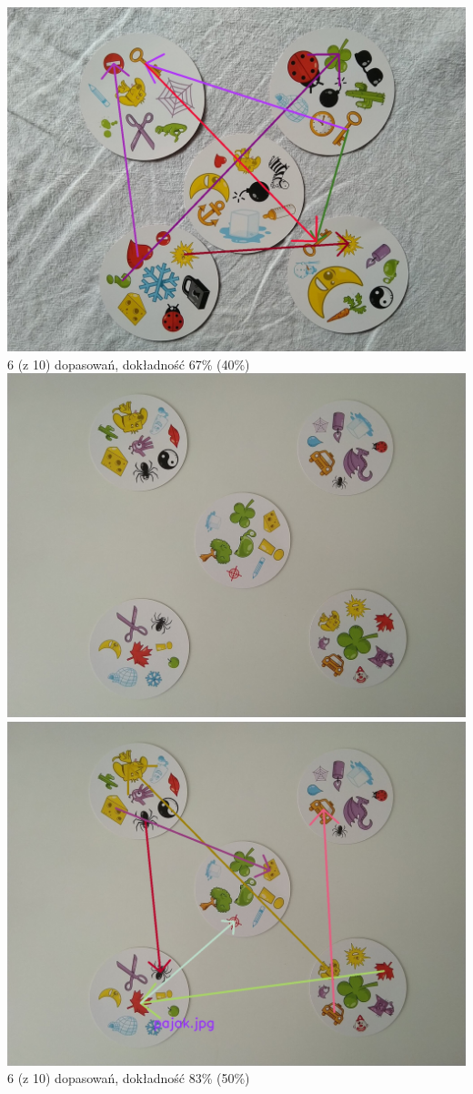 \documentclass[10pt,a4paper]{article}
\begin{document}
\begin{center}
\includegraphics[scale=0.28]{hard/img_arrows9.jpg}\\
6 (z 10) dopasowań, dokładność 67\% (40\%)
\includegraphics[scale=0.28]{hard/dobble27.jpg}
\includegraphics[scale=0.28]{hard/img_arrows8.jpg}\\
6 (z 10) dopasowań, dokładność 83\% (50\%)
\end{center}
\newpage
\end{document}
